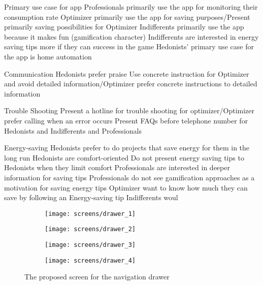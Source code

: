 Primary use case for app
	Professionals primarily use the app for monitoring their consumption rate
	Optimizer primarily use the app for saving purposes/Present primarily saving possibilities for Optimizer
	Indifferents primarily use the app because it makes fun (gamification character) Indifferents are interested in energy saving tips more if they can success in the game
	Hedonists' primary use case for the app is home automation

Communication
	Hedonists prefer praise 
	Use concrete instruction for Optimizer and avoid detailed information/Optimizer prefer concrete instructions to detailed information

Trouble Shooting
	Present a hotline for trouble shooting for optimizer/Optimizer prefer calling when an error occurs
	Present FAQs before telephone number for Hedonists and Indifferents and Professionals

Energy-saving
	Hedonists prefer to do projects that save energy for them in the long run
	Hedonists are comfort-oriented Do not present energy saving tips to Hedonists when they limit comfort
	Professionals are interested in deeper information for saving tips
	Professionals do not see gamification approaches as a motivation for saving energy tips
	Optimizer want to know how much they can save by following an Energy-saving tip
	Indifferents woul






 




\begin{figure}[h]
	\centering
	\begin{subfigure}[b]{0.24\columnwidth}
		\centering
		\texttt{[image: screens/drawer\_1]}
		\label{fig:drawer:professional}
	\end{subfigure}
	\begin{subfigure}[b]{0.24\columnwidth}
		\centering
		\texttt{[image: screens/drawer\_2]}
		\label{fig:drawer:optimizer}
	\end{subfigure}
	\begin{subfigure}[b]{0.24\columnwidth}
		\centering
		\texttt{[image: screens/drawer\_3]}
		\label{fig:drawer:indifferent}
	\end{subfigure}
	\begin{subfigure}[b]{0.24\columnwidth}
		\centering
		\texttt{[image: screens/drawer\_4]}
		\label{fig:drawer:hedonist}
	\end{subfigure}
	\caption{The proposed screen for the navigation drawer}
	\label{fig:drawer} %
\end{figure}


